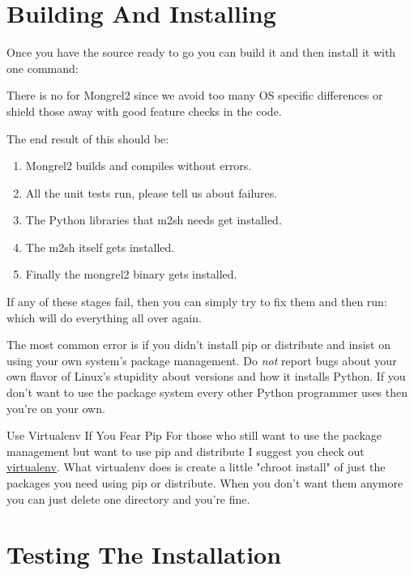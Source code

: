 \section{Building And Installing}

Once you have the source ready to go you can build it and then install it with
one command:  

There is no  for Mongrel2 since we avoid too many OS specific
differences or shield those away with good feature checks in the code.

The end result of this should be:

\begin{enumerate}
\item Mongrel2 builds and compiles without errors.
\item All the unit tests run, please tell us about failures.
\item The Python libraries that m2sh needs get installed.
\item The m2sh itself gets installed.
\item Finally the mongrel2 binary gets installed.
\end{enumerate}

If any of these stages fail, then you can simply try to fix them and then
run:   which will do everything all over again.

The most common error is if you didn't install pip or distribute and insist
on using your own system's package management.  Do \emph{not} report bugs about
your own flavor of Linux's stupidity about versions and how it installs Python.
If you don't want to use the package system every other Python programmer uses
then you're on your own.

\begin{aside}{Use Virtualenv If You Fear Pip}
For those who still want to use the package management but want to use pip and
distribute I suggest you check out \href{http://pypi.python.org/pypi/virtualenv}{virtualenv}.
What virtualenv does is create a little "chroot install" of just the packages
you need using pip or distribute.  When you don't want them anymore you can just
delete one directory and you're fine.
\end{aside}


\section{Testing The Installation}

